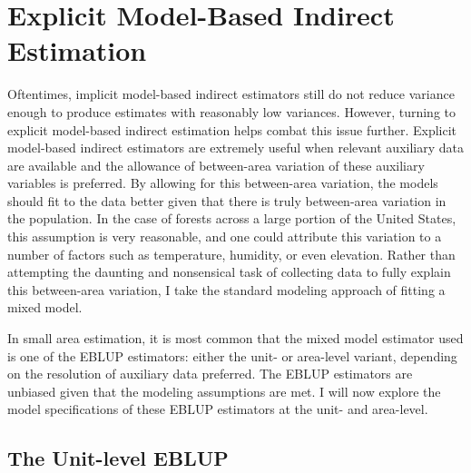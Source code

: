 \documentclass[12pt,twoside]{reedthesis}
\begin{document}
\hypertarget{explicit-model-based-indirect-estimation}{%
\section{Explicit Model-Based Indirect Estimation}\label{explicit-model-based-indirect-estimation}}

Oftentimes, implicit model-based indirect estimators still do not reduce variance enough to produce estimates with reasonably low variances. However, turning to explicit model-based indirect estimation helps combat this issue further. Explicit model-based indirect estimators are extremely useful when relevant auxiliary data are available and the allowance of between-area variation of these auxiliary variables is preferred. By allowing for this between-area variation, the models should fit to the data better given that there is truly between-area variation in the population. In the case of forests across a large portion of the United States, this assumption is very reasonable, and one could attribute this variation to a number of factors such as temperature, humidity, or even elevation. Rather than attempting the daunting and nonsensical task of collecting data to fully explain this between-area variation, I take the standard modeling approach of fitting a mixed model.

In small area estimation, it is most common that the mixed model estimator used is one of the EBLUP estimators: either the unit- or area-level variant, depending on the resolution of auxiliary data preferred. The EBLUP estimators are unbiased given that the modeling assumptions are met. I will now explore the model specifications of these EBLUP estimators at the unit- and area-level.

\hypertarget{the-unit-level-eblup}{%
\subsection{The Unit-level EBLUP}\label{the-unit-level-eblup}}
\end{document}
